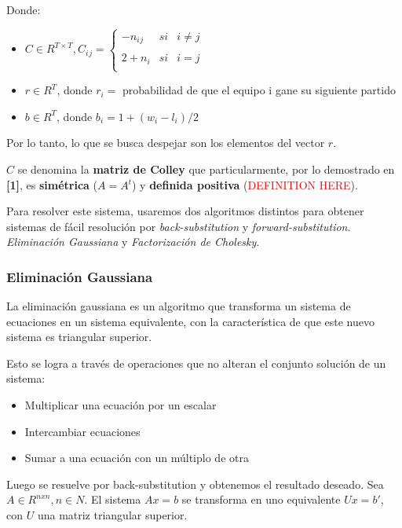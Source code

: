 Donde:

\begin{itemize}
\item 
$C \in R^{T \times T}, C{_i}{_j} =
\left\{
	\begin{array}{lcc}
		-n{_i}{_j} & si & i \neq j \\
		\\ 2 + n{_i} & si & i = j \\
	\end{array}
\right.$
\item $r \in R^{T}$, donde $r{_i} = $ probabilidad de que el equipo i gane su siguiente partido
\item $b \in R^{T}$, donde $b{_i} = 1 + (w{_i} - l{_i}) / 2$
\end{itemize}

Por lo tanto, lo que se busca despejar son los elementos del vector $r$.

$C$ se denomina la \textbf{matriz de Colley} que particularmente, por lo demostrado en \textbf{[1]}, es \textbf{sim\'etrica} ($A = A{^t}$) y \textbf{definida positiva} (\textcolor{red}{DEFINITION HERE}).

Para resolver este sistema, usaremos dos algoritmos distintos para obtener sistemas de f\'acil resoluci\'on por \textit{back-substitution} y \textit{forward-substitution}. \textit{Eliminaci\'on Gaussiana} y \textit{Factorizaci\'on de Cholesky}.

\subsubsection{Eliminaci\'on Gaussiana}

La eliminaci\'on gaussiana es un algoritmo que transforma un sistema de ecuaciones en un sistema equivalente, con la caracter\'istica de que este nuevo sistema es triangular superior.

Esto se logra a través de operaciones que no alteran el conjunto solución de un sistema:

\begin{itemize}
\item Multiplicar una ecuación por un escalar
\item Intercambiar ecuaciones
\item Sumar a una ecuación con un múltiplo de otra
\end{itemize} 

Luego se resuelve por back-substitution y obtenemos el resultado deseado. Sea $A \in R^{nxn}, n \in N$. El sistema $Ax = b$ se transforma en uno equivalente $Ux = b'$, con $U$ una matriz triangular superior. \\

